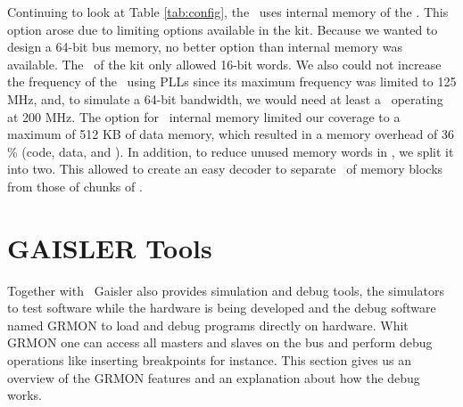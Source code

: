 Continuing to look at Table \ref{tab:config}, the \ptagmem~uses internal memory of the \fpga. This option arose due to limiting options available in the kit. Because we wanted to design a 64-bit bus memory, no better option than internal memory was available. The \sram~of the kit only allowed 16-bit words. We also could not increase the frequency of the \sram~using PLLs since its maximum frequency was limited to 125 MHz, and, to simulate a 64-bit bandwidth, we would need at least a \sram~operating at 200 MHz. The option for \fpga~internal memory limited our coverage to a maximum of 512 KB of data memory, which resulted in a memory overhead of 36 \% (code, data, and \mt). In addition, to reduce unused memory words in \ptagmem, we split it into two. This allowed to create an easy decoder to separate \ptags~of memory blocks from those of chunks of \ptags. 




\section{GAISLER Tools}
\label{sec:gaisler_tools}
Together with \leon~Gaisler also provides simulation and debug tools,  the simulators to test software while the hardware is being developed and the debug software named  GRMON to load and debug programs directly on hardware. Whit GRMON one can access all masters and slaves on the bus and perform debug operations like inserting breakpoints for instance.  This section gives us an overview of the GRMON features and an explanation about how the debug works.

